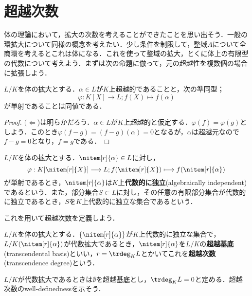 \section{超越次数}
体の理論において，拡大の次数を考えることができたことを思い出そう．一般の環拡大について同様の概念を考えたい．少し条件を制限して，整域$A$について全商環を考えるとこれは体になる．これを使って整域の拡大，とくに体上の有限型の代数について考えよう．まずは次の命題に倣って，元の超越性を複数個の場合に拡張しよう．

\begin{prop}
	$L/K$を体の拡大とする．$\alpha\in L$が$K$上超越的であることと，次の準同型；
	\[\varphi:K[X]\longrightarrow L;f(X)\longmapsto f(\alpha)\]
	が単射であることは同値である．
\end{prop}

\begin{proof}
	$(\Longleftarrow$)は明らかだろう．$\alpha\in L$が$K$上超越的と仮定する．$\varphi(f)=\varphi(g)$としよう．このとき$\varphi(f-g)=(f-g)(\alpha)=0$となるが，$\alpha$は超越元なので$f-g=0$となり，$f=g$である．
\end{proof}

\begin{defi}[代数的に独立]
	$L/K$を体の拡大とする．$\nitem[r]{\alpha}\in L$に対し，
	\[\varphi:K[\nitem[r]{X}]\longrightarrow L;f(\nitem[r]{X})\longmapsto f(\nitem[r]{\alpha})\]
	が単射であるとき，$\nitem[r]{\alpha}$は$K$上\textbf{代数的に独立}(algebraically independent)であるという．また，部分集合$S\subset L$に対し，その任意の有限部分集合が代数的に独立であるとき，$S$を$K$上代数的に独立な集合であるという．
\end{defi}

これを用いて超越次数を定義しよう．

\begin{defi}[超越基底]
	$L/K$を体の拡大とする．$\{\nitem[r]{\alpha}\}$が$K$上代数的に独立な集合で，$L/K(\nitem[r]{\alpha})$が代数拡大であるとき，$\nitem[r]{\alpha}$を$L/K$の\textbf{超越基底}(transcendental basis)といい，$r=\trdeg_K L$とかいてこれを\textbf{超越次数}(transcendence degree)という．
\end{defi}

$L/K$が代数拡大であるときは$\emptyset$を超越基底とし，$\trdeg_K L=0$と定める．超越次数のwell-definednessを示そう．

